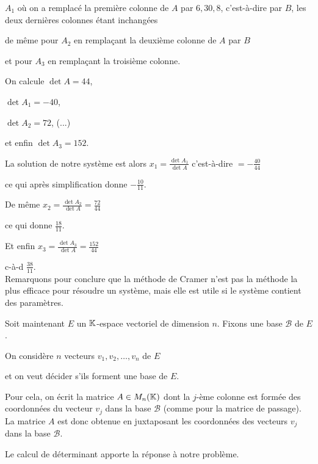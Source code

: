 \change
$A_1$ où on a remplacé la première colonne de $A$ par $6, 30, 8$, c'est-à-dire par $B$, les deux dernières colonnes étant inchangées

\change
de même pour $A_2$ en remplaçant la deuxième colonne de $A$ par $B$

\change
et pour $A_3$ en remplaçant la troisième colonne.

\change
On calcule  $\det A  =  44$,

\change
$\det A_1  =  -40$,

\change
$\det A_2  =  72$, (...)

\change
et enfin $\det A_3  =  152.$

\change
La solution de notre système est alors 
$
x_1 = \frac{\det A_1}{\det A} $ c'est-à-dire $= -\frac{40}{44} $

\change
ce qui après simplification donne $ -\frac{10}{11}$.

\change
De même $x_2 = \frac{\det A_2}{\det A} = \frac{72}{44} $

\change
ce qui donne $\frac{18}{11}$.

\change
Et enfin $x_3 = \frac{\det A_3}{\det A} = \frac{152}{44} $

\change
c-à-d $ \frac{38}{11}$. \\


Remarquons pour conclure que la méthode de Cramer n'est pas la méthode la plus efficace 
pour résoudre un système, mais elle est utile si le système contient des paramètres.


\diapo

Soit maintenant $E$ un $\mathbb{K}$-espace vectoriel de dimension $n$. Fixons une base $\mathcal{B}$ de $E$.

\change
On considère $n$ vecteurs $v_1,v_2,\ldots,v_n$ de $E$

\change
et on  veut décider s'ils forment une base de $E$.

\change
Pour cela, on écrit la matrice $A \in M_n(\mathbb{K})$ dont la $j$-ème colonne est formée
des coordonnées du vecteur $v_j$ dans la base $\mathcal{B}$ 
(comme pour la matrice de passage). \\

La matrice $A$ est donc obtenue en juxtaposant les coordonnées des vecteurs $v_j$ dans la base $\mathcal{B}$.

\change
Le calcul de déterminant apporte la réponse à notre problème. \\

